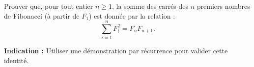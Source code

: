 Prouver que, pour tout entier $n \geq 1$, la somme des carrés des $n$
premiers nombres de Fibonacci (à partir de $F_1$) est donnée par la relation :
\[
\sum_{i=1}^{n} F_i^2 = F_n F_{n+1}.
\]

\textbf{Indication :} Utiliser une démonstration par récurrence pour valider
cette identité.
